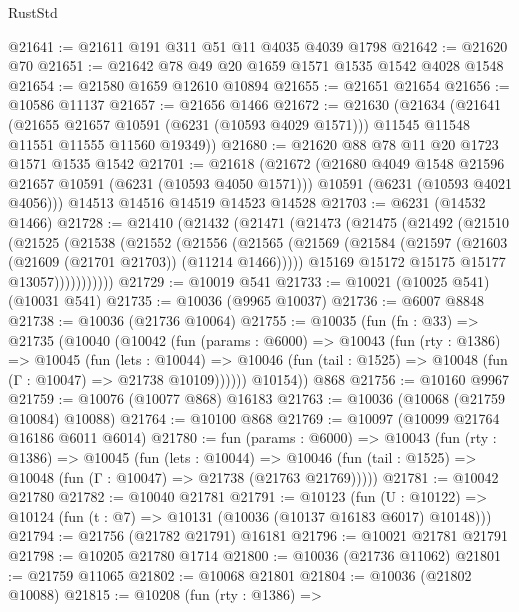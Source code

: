 \begin{lexlean}{RustStd}
\begin{coremodule}
{{@21641 := @21611 @191 @311 @51 @11 @4035 @4039 @1798
@21642 := @21620 @70
@21651 := @21642 @78 @49 @20 @1659 @1571 @1535 @1542 @4028 @1548
@21654 := @21580 @1659 @12610 @10894
@21655 := @21651 @21654
@21656 := @10586 @11137
@21657 := @21656 @1466
@21672 := @21630
    (@21634
      (@21641
        (@21655 @21657 @10591 (@6231 (@10593 @4029 @1571)))
        @11545
        @11548
        @11551
        @11555
        @11560
        @19349))
@21680 := @21620 @88 @78 @11 @20 @1723 @1571 @1535 @1542
@21701 := @21618
    (@21672
      (@21680 @4049 @1548 @21596 @21657 @10591 (@6231 (@10593 @4050 @1571)))
      @10591
      (@6231 (@10593 @4021 @4056)))
    @14513
    @14516
    @14519
    @14523
    @14528
@21703 := @6231 (@14532 @1466)
@21728 := @21410
    (@21432
      (@21471
        (@21473
          (@21475
            (@21492
              (@21510
                (@21525
                  (@21538
                    (@21552
                      (@21556
                        (@21565
                          (@21569
                            (@21584 (@21597 (@21603 (@21609 (@21701 @21703)) (@11214 @1466)))))
                          @15169
                          @15172
                          @15175
                          @15177
                          @13057)))))))))))
@21729 := @10019 @541
@21733 := @10021 (@10025 @541) (@10031 @541)
@21735 := @10036 (@9965 @10037)
@21736 := @6007 @8848
@21738 := @10036 (@21736 @10064)
@21755 := @10035
    (fun (fn : @33) =>
    @21735
      (@10040
        (@10042
          (fun (params : @6000) =>
          @10043
            (fun (rty : @1386) =>
            @10045
              (fun (lets : @10044) =>
              @10046 (fun (tail : @1525) => @10048 (fun (Γ : @10047) => @21738 @10109))))))
        @10154))
    @868
@21756 := @10160 @9967
@21759 := @10076 (@10077 @868) @16183
@21763 := @10036 (@10068 (@21759 @10084) @10088)
@21764 := @10100 @868
@21769 := @10097 (@10099 @21764 @16186 @6011 @6014)
@21780 := fun (params : @6000) =>
  @10043
    (fun (rty : @1386) =>
    @10045
      (fun (lets : @10044) =>
      @10046 (fun (tail : @1525) => @10048 (fun (Γ : @10047) => @21738 (@21763 @21769)))))
@21781 := @10042 @21780
@21782 := @10040 @21781
@21791 := @10123
    (fun (U : @10122) => @10124 (fun (t : @7) => @10131 (@10036 (@10137 @16183 @6017) @10148)))
@21794 := @21756 (@21782 @21791) @16181
@21796 := @10021 @21781 @21791
@21798 := @10205 @21780 @1714
@21800 := @10036 (@21736 @11062)
@21801 := @21759 @11065
@21802 := @10068 @21801
@21804 := @10036 (@21802 @10088)
@21815 := @10208
    (fun (rty : @1386) =>
}}
\end{coremodule}
\end{lexlean}
